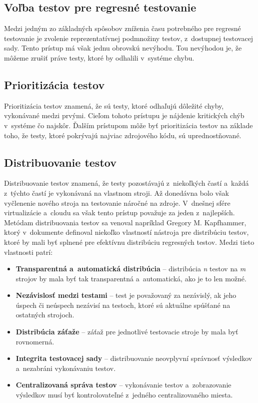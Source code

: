 \subsection*{Voľba testov pre regresné testovanie}
Medzi jedným zo základných spôsobov zníženia času potrebného pre 
regresné testovanie je zvolenie reprezentatívnej podmnožiny testov,
z~dostupnej testovacej sady. Tento prístup má však jednu obrovskú nevýhodu. 
Tou nevýhodou je, že môžeme zrušiť práve testy, ktoré by odhalili 
v~systéme chybu. 

\subsection*{Prioritizácia testov}
Prioritizácia testov znamená, že sú testy, ktoré odhaľujú dôležité chyby, 
vykonávané medzi prvými. Cieľom tohoto prístupu je nájdenie kritických 
chýb v~systéme čo najskôr. Ďalším prístupom môže byť prioritizácia testov 
na základe toho, že testy, ktoré pokrývajú najviac zdrojového kódu,
sú uprednostňované.

\subsection*{Distribuovanie testov}
Distribuovanie testov znamená, že testy pozostávajú z~niekoľkých častí 
a~každá z~týchto častí je vykonávaná na vlastnom stroji.
Až donedávna bolo však vyčlenenie nového stroja na testovanie náročné 
na zdroje. V~dnešnej sfére virtualizácie a~cloudu sa však tento prístup 
považuje za jeden z~najlepších. 
Metódam distribuovania testov sa venoval napríklad Gregory M. Kapfhammer, 
ktorý v~dokumente \cite{Kapfhammer} definoval niekoľko vlastností nástroja 
pre distribúciu testov, ktoré by mali byť splnené pre efektívnu 
distribúciu regresných testov. Medzi tieto vlastnosti patrí:
\begin{itemize}
\item \textbf{Transparentná a~automatická distribúcia} -- distribúcia 
\emph{n} testov na \emph{m} strojov by mala byť tak transparentná 
a~automatická, ako je to len možné.
\item \textbf{Nezávislosť medzi testami} -- test je považovaný za 
nezávislý, ak jeho úspech či neúspech nezávisí na testoch, ktoré sú 
aktuálne spúšťané na ostatných strojoch. 
\item \textbf{Distribúcia záťaže} -- záťaž pre jednotlivé testovacie 
stroje by mala byť rovnomerná.
\item \textbf{Integrita testovacej sady} -- distribuovanie neovplyvní 
správnosť výsledkov a~nezabráni vykonávaniu testov.
\item \textbf{Centralizovaná správa testov} -- vykonávanie testov 
a~zobrazovanie výsledkov musí byť kontrolovateľné z~jedného 
centralizovaného miesta.
\end{itemize}




